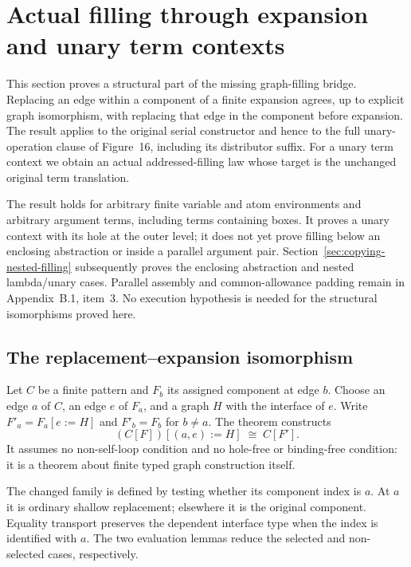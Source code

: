 \clearpage
\section{Actual filling through expansion and unary term contexts}
\label{sec:copying-expansion-plug}
This section proves a structural part of the missing graph-filling bridge.
Replacing an edge within a component of a finite expansion agrees, up to
explicit graph isomorphism, with replacing that edge in the component before
expansion. The result applies to the original serial constructor and hence
to the full unary-operation clause of Figure~16, including its distributor
suffix. For a unary term context we obtain an actual addressed-filling law
whose target is the unchanged original term translation.

The result holds for arbitrary finite variable and atom environments and
arbitrary argument terms, including terms containing boxes. It proves a
unary context with its hole at the outer level; it does not yet prove
filling below an enclosing abstraction or inside a parallel argument pair.
Section~\ref{sec:copying-nested-filling} subsequently proves the enclosing
abstraction and nested lambda/unary cases. Parallel assembly and
common-allowance padding remain in Appendix~B.1, item~3. No execution hypothesis is needed for the structural isomorphisms
proved here.

\subsection{The replacement--expansion isomorphism}
Let $C$ be a finite pattern and $F_b$ its assigned component at edge $b$.
Choose an edge $a$ of $C$, an edge $e$ of $F_a$, and a graph $H$ with the
interface of $e$. Write $F'_a=F_a[e:=H]$ and $F'_b=F_b$ for $b\ne a$.
The theorem constructs
\[
  (C[F])[(a,e):=H]\;\cong\; C[F'].
\]
It assumes no non-self-loop condition and no hole-free or binding-free
condition: it is a theorem about finite typed graph construction itself.


The changed family is defined by testing whether its component index is
$a$. At $a$ it is ordinary shallow replacement; elsewhere it is the original
component. Equality transport preserves the dependent interface type when
the index is identified with $a$. The two evaluation lemmas reduce the
selected and non-selected cases, respectively.



